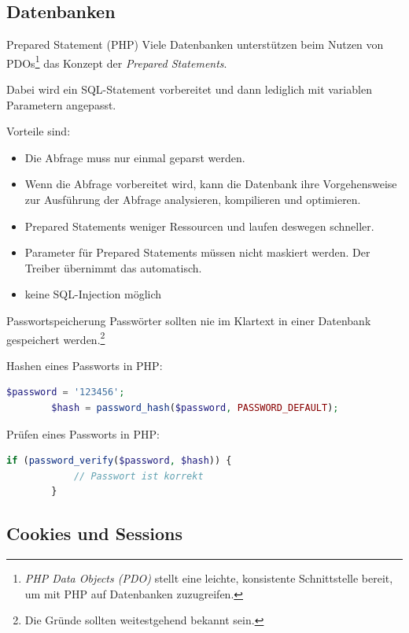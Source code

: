 \subsection{Datenbanken}

\begin{bonus}{Prepared Statement (PHP)}
    Viele Datenbanken unterstützen beim Nutzen von PDOs\footnote{\emph{PHP Data Objects (PDO)} stellt eine leichte, konsistente Schnittstelle bereit, um mit PHP auf Datenbanken zuzugreifen.} das Konzept der \emph{Prepared Statements}.

    Dabei wird ein SQL-Statement vorbereitet und dann lediglich mit variablen Parametern angepasst.

    Vorteile sind:
    \begin{itemize}
        \item Die Abfrage muss nur einmal geparst werden.
        \item Wenn die Abfrage vorbereitet wird, kann die Datenbank ihre Vorgehensweise zur Ausführung der Abfrage analysieren, kompilieren und optimieren.
        \item Prepared Statements weniger Ressourcen und laufen deswegen schneller.
        \item Parameter für Prepared Statements müssen nicht maskiert werden. Der Treiber übernimmt das automatisch.
        \item keine SQL-Injection möglich
    \end{itemize}
\end{bonus}

\begin{bonus}{Passwortspeicherung}
    Passwörter sollten nie im Klartext in einer Datenbank gespeichert werden.\footnote{Die Gründe sollten weitestgehend bekannt sein.}

    Hashen eines Passworts in PHP:
    \begin{lstlisting}[language=php]
        $password = '123456';
        $hash = password_hash($password, PASSWORD_DEFAULT);
    \end{lstlisting}

    Prüfen eines Passworts in PHP:
    \begin{lstlisting}[language=php]
        if (password_verify($password, $hash)) {
            // Passwort ist korrekt
        }
    \end{lstlisting}
\end{bonus}

\subsection{Cookies und Sessions}

